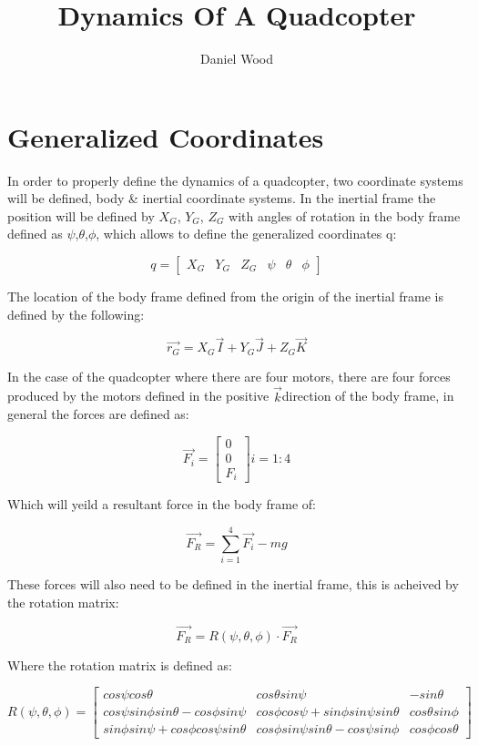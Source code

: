 \documentclass[10pt, letterpaper]{article}
\begin{document}
\title{Dynamics Of A Quadcopter}
\author{Daniel Wood}
\maketitle

\section{Generalized Coordinates}
In order to properly define the dynamics of a quadcopter, two coordinate systems will be defined, body \& inertial coordinate systems. In the inertial frame the position will be defined by $X_{G}$, $Y_{G}$, $Z_{G}$ with angles of rotation in the body frame defined as $\psi$,$\theta$,$\phi$, which allows to define the generalized coordinates q:

\[
q=\left[\begin{array}{cccccc}
X_{G} & Y_{G} & Z_{G} & \psi & \theta & \phi\end{array}\right]
\]

The location of the body frame defined from the origin of the inertial
frame is defined by the following:

\[
\overrightarrow{r_{G}}=X_{G}\overrightarrow{I}+Y_{G}\overrightarrow{J}+Z_{G}\overrightarrow{K}
\]

In the case of the quadcopter where there are four motors, there are
four forces produced by the motors defined in the positive $\overrightarrow{k}$direction
of the body frame, in general the forces are defined as:

\[
\overrightarrow{F_{i}}=\left[\begin{array}{c}
0\\
0\\
F_{i}
\end{array}\right]i=1:4
\]

Which will yeild a resultant force in the body frame of:

\[
\overrightarrow{F_{R}}=\sum_{i=1}^{4}\overrightarrow{F_{i}}-mg
\]

These forces will also need to be defined in the inertial frame, this
is acheived by the rotation matrix:

\[
\overrightarrow{F_{R}}=R(\psi,\theta,\phi)\cdot \overrightarrow{F_{R}}
\]

Where the rotation matrix is defined as:

\[
R(\psi,\theta,\phi)=\left[\begin{array}{ccc}
cos\psi cos\theta & cos\theta sin\psi & -sin\theta\\
cos\psi sin\phi sin\theta-cos\phi sin\psi & cos\phi cos\psi+sin\phi sin\psi sin\theta & cos\theta sin\phi\\
sin\phi sin\psi+cos\phi cos\psi sin\theta & cos\phi sin\psi sin\theta-cos\psi sin\phi & cos\phi cos\theta
\end{array}\right]
\]
\end{document}

